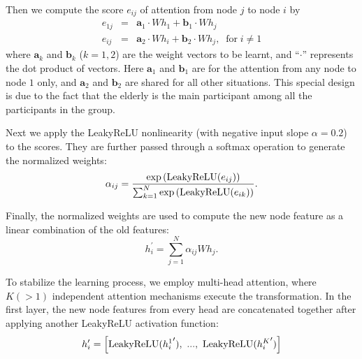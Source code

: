 \documentclass[VANCOUVER,STIX1COL]{WileyNJD-v2}
\begin{document}
Then we compute the score $e_{ij}$ of attention from node $j$ to node $i$ by
\begin{eqnarray}
e_{1j} &=& \mathbf{a}_1\cdot W h_1 +   \mathbf{b}_1 \cdot W h_j \\
e_{ij} &=& \mathbf{a}_2\cdot W h_i +   \mathbf{b}_2 \cdot W h_j, \;\; \text{for}\; i \neq 1
\end{eqnarray}
where $\mathbf{a}_k$ and $\mathbf{b}_k$ ($k=1,2$) are the weight vectors to be learnt, and ``$\cdot$'' represents the dot product of vectors. Here $\mathbf{a}_1$ and $\mathbf{b}_1$ are for the attention from any node to node $1$ only, and $\mathbf{a}_2$ and $\mathbf{b}_2$ are shared for all other situations. This special design is due to the fact that the elderly is the main participant among all the participants in the group.

Next we apply the LeakyReLU nonlinearity (with negative input slope $\alpha = 0.2$) to the scores. They are further passed through a softmax operation to generate the normalized weights:
\begin{equation}
    \alpha_{ij} = \frac{{\rm exp}\left({\rm LeakyReLU}(e_{ij})\right)}{\sum_{k=1}^{N}{\rm exp}\left({\rm LeakyReLU}(e_{ik})\right)}.
\end{equation}


Finally, the normalized weights are used to compute the new node feature as a linear combination of the old features:
\begin{equation}
  h_i^{\prime} = \sum\limits_{j=1}^{N} \alpha_{ij}W h_j.
\end{equation}

To stabilize the learning process, we employ multi-head attention, where $K (>1)$ independent attention mechanisms execute the transformation. In the first layer, the new node features from every head are concatenated together after applying another LeakyReLU activation function:
\begin{equation}
  h_i^{\prime} = \left[ {\rm LeakyReLU}({h_i^1}^{\prime}),\ ...,\ {\rm LeakyReLU}({h_i^K}^{\prime}) \right]
\end{equation}
\end{document}
